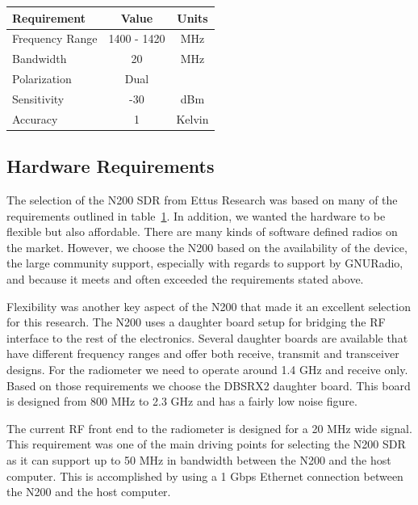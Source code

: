 \begin{table}[h!tb] \centering
{}
\label{requirements}
\begin{tabular}{lcc} \hline
\textbf{Requirement} & \textbf{Value} & \textbf{Units} \\ \hline
Frequency Range & 1400 - 1420 & MHz \\
Bandwidth & 20 & MHz \\
Polarization & Dual &  \\ 
Sensitivity & -30 & dBm \\
Accuracy & 1 & Kelvin \\ \hline
\end{tabular}
\end{table}

\subsection{Hardware Requirements}

The selection of the N200 SDR from Ettus Research was based on many of the requirements outlined in table~\ref{requirements}.  In addition, we wanted the hardware to be flexible but also affordable.  There are many kinds of software defined radios on the market.  However, we choose the N200 based on the availability of the device, the large community support, especially with regards to support by GNURadio, and because it meets and often exceeded the requirements stated above.  

Flexibility was another key aspect of the N200 that made it an excellent selection for this research.  The N200 uses a daughter board setup for bridging the RF interface to the rest of the electronics.  Several daughter boards are available that have different frequency ranges and offer both receive, transmit and transceiver designs.  For the radiometer we need to operate around 1.4 GHz and receive only.  Based on those requirements we choose the DBSRX2 daughter board.  This board is designed from 800 MHz to 2.3 GHz and has a fairly low noise figure.

The current RF front end to the radiometer is designed for a 20 MHz wide signal.  This requirement was one of the main driving points for selecting the N200 SDR as it can support up to 50 MHz in bandwidth between the N200 and the host computer.  This is accomplished by using a 1 Gbps Ethernet connection between the N200 and the host computer.

